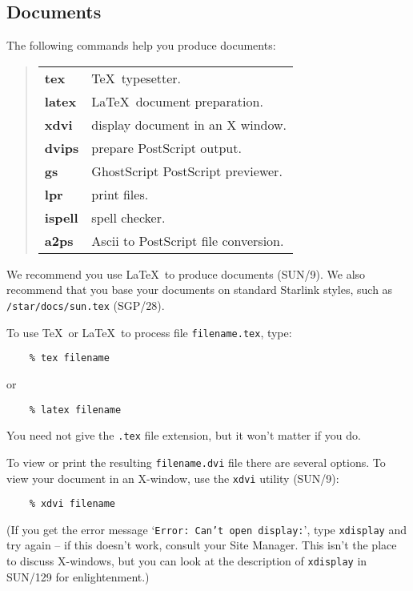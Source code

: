 \documentclass[twoside,11pt]{article}
\newcommand{\xref}[3]{#1}
\begin{document}
\subsection{Documents}
The following commands help you produce documents:
\begin{quote}
\begin{tabular}{lp{67mm}}

{\bf tex}   & \TeX\ typesetter.\\
{\bf latex} & \LaTeX\ document preparation.\\
{\bf xdvi}  & display document in an X window.\\
{\bf dvips} & prepare PostScript output.\\
{\bf gs}    & GhostScript PostScript previewer.\\
{\bf lpr}   & print files.\\
{\bf ispell} & spell checker.\\
{\bf a2ps} & Ascii to PostScript file conversion.

\end{tabular}
\end{quote}
We recommend you use \LaTeX\ to produce documents
(\xref{SUN/9}{sun9}{}).
We also recommend that you base your documents on standard Starlink styles,
such as {\tt /star/docs/sun.tex}
(\xref{SGP/28}{sgp28}{}).

To use \TeX\ or \LaTeX\ to process file {\tt filename.tex}, type:
\begin{verbatim}
    % tex filename
\end{verbatim}
or
\begin{verbatim}
    % latex filename
\end{verbatim}
You need not give the {\tt .tex} file extension, but it won't matter if you
do. 

To view or print the resulting {\tt filename.dvi} file there are several
options. 
To view your document in an X-window, use the {\tt xdvi} utility
(\xref{SUN/9}{sun9}{}):
\begin{verbatim}
    % xdvi filename
\end{verbatim}
(If you get the error message `{\tt Error: Can't open display:}', type
{\tt xdisplay} and try again -- if this doesn't work, consult your Site
Manager.
This isn't the place to discuss X-windows, but you can look at the description
of {\tt xdisplay} in 
\xref{SUN/129}{sun129}{} for enlightenment.)
\end{document}
